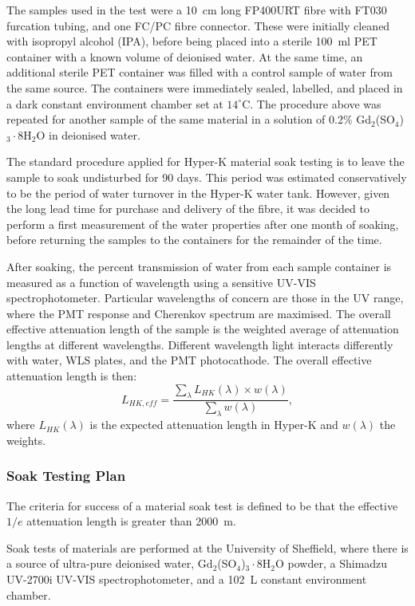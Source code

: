 \documentclass[a4paper,11pt]{article}
\newcommand{\hk}{Hyper-K\xspace}
\begin{document}
The samples used in the test were a 10~cm long FP400URT fibre with FT030 furcation tubing, and one FC/PC fibre connector. These were initially cleaned with isopropyl alcohol (IPA), before being  placed into a sterile 100~ml PET container with a known volume of deionised water. At the same time, an additional sterile PET container was filled with a control sample of water from the same source. The containers were immediately sealed, labelled, and placed in a dark constant environment chamber set at $14^\circ$C. The procedure above was repeated for another sample of the same material in a solution of 0.2\% Gd$_2$(SO$_4$)$_3\cdot$8H$_2$O in deionised water.

The standard procedure applied for \hk material soak testing is to leave the sample to soak undisturbed for 90 days. This period was estimated conservatively to be the period of water turnover in the \hk water tank. However, given the long lead time for purchase and delivery of the fibre, it was decided to perform a first measurement of the water properties after one month of soaking, before returning the samples to the containers for the remainder of the time.

After soaking, the percent transmission of water from each sample container is measured as a function of wavelength using a sensitive UV-VIS spectrophotometer. Particular wavelengths of concern are those in the UV range, where the PMT response and Cherenkov spectrum are maximised. The overall effective attenuation length of the sample is the weighted average of attenuation lengths at different wavelengths. Different wavelength light interacts differently with water, WLS plates, and the PMT photocathode. The overall effective attenuation length is then:
\begin{equation}
L_{HK,eff} = \frac{\sum_{\lambda} L_{HK}\left(\lambda\right)\times w\left(\lambda\right)}{\sum_{\lambda} w\left(\lambda\right)},
\end{equation}
where $L_{HK}(\lambda)$ is the expected attenuation length in \hk and $w(\lambda)$ the weights.

\subsubsection{Soak Testing Plan}
The criteria for success of a material soak test is defined to be that the effective $1/e$ attenuation length is greater than 2000~m.

Soak tests of materials are performed at the University of Sheffield, where there is a source of ultra-pure deionised water, Gd$_2$(SO$_4$)$_3\cdot$8H$_2$O powder, a Shimadzu UV-2700i UV-VIS spectrophotometer, and a 102~L constant environment chamber.
\end{document}
